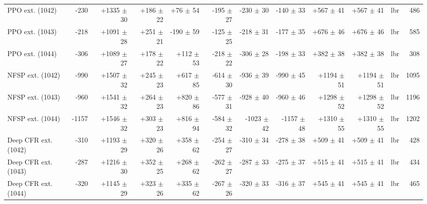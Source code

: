 \begin{tabular}{lrrrrrrrrrrr}
PPO ext. (1042) & -230 & +1335 $\pm$ 30 & +186 $\pm$ 22 & +76 $\pm$ 54 & -195 $\pm$ 27 & -230 $\pm$ 30 & -140 $\pm$ 33 & +567 $\pm$ 41 & +567 $\pm$ 41 & lbr & 486 \\
PPO ext. (1043) & -218 & +1091 $\pm$ 28 & +251 $\pm$ 21 & -190 $\pm$ 59 & -125 $\pm$ 25 & -218 $\pm$ 31 & -177 $\pm$ 35 & +676 $\pm$ 46 & +676 $\pm$ 46 & lbr & 585 \\
PPO ext. (1044) & -306 & +1089 $\pm$ 27 & +178 $\pm$ 22 & +112 $\pm$ 53 & -218 $\pm$ 22 & -306 $\pm$ 28 & -198 $\pm$ 33 & +382 $\pm$ 38 & +382 $\pm$ 38 & lbr & 308 \\
NFSP ext. (1042) & -990 & +1507 $\pm$ 32 & +245 $\pm$ 23 & +617 $\pm$ 85 & -614 $\pm$ 30 & -936 $\pm$ 39 & -990 $\pm$ 45 & +1194 $\pm$ 51 & +1194 $\pm$ 51 & lbr & 1095 \\
NFSP ext. (1043) & -960 & +1541 $\pm$ 32 & +264 $\pm$ 23 & +820 $\pm$ 86 & -577 $\pm$ 31 & -928 $\pm$ 40 & -960 $\pm$ 46 & +1298 $\pm$ 52 & +1298 $\pm$ 52 & lbr & 1196 \\
NFSP ext. (1044) & -1157 & +1546 $\pm$ 32 & +303 $\pm$ 23 & +816 $\pm$ 94 & -584 $\pm$ 32 & -1023 $\pm$ 42 & -1157 $\pm$ 48 & +1310 $\pm$ 55 & +1310 $\pm$ 55 & lbr & 1202 \\
Deep CFR ext. (1042) & -310 & +1193 $\pm$ 29 & +320 $\pm$ 26 & +358 $\pm$ 62 & -254 $\pm$ 27 & -310 $\pm$ 34 & -278 $\pm$ 38 & +509 $\pm$ 41 & +509 $\pm$ 41 & lbr & 428 \\
Deep CFR ext. (1043) & -287 & +1216 $\pm$ 30 & +352 $\pm$ 25 & +268 $\pm$ 62 & -262 $\pm$ 27 & -287 $\pm$ 33 & -275 $\pm$ 37 & +515 $\pm$ 41 & +515 $\pm$ 41 & lbr & 434 \\
Deep CFR ext. (1044) & -320 & +1145 $\pm$ 29 & +323 $\pm$ 26 & +335 $\pm$ 62 & -267 $\pm$ 26 & -320 $\pm$ 33 & -316 $\pm$ 37 & +545 $\pm$ 41 & +545 $\pm$ 41 & lbr & 465 \\
\bottomrule
\end{tabular}
